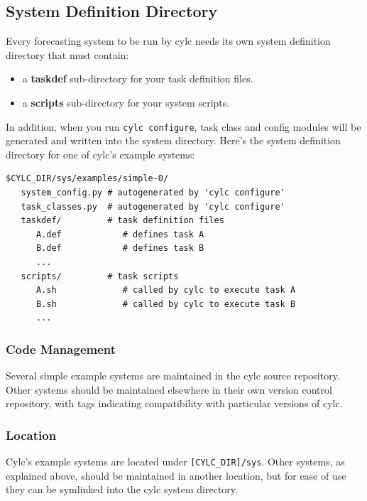 \documentclass[11pt,a4paper]{article}
\begin{document}
\label{sec:systemdefdir}
\subsection{System Definition Directory}

Every forecasting system to be run by cylc needs its own system
definition directory that must contain: 

\begin{itemize} 
    \item a {\bf taskdef} sub-directory for your task definition files.
    \item a {\bf scripts} sub-directory for your system scripts.
\end{itemize} 

In addition, when you run \lstinline{cylc configure}, task class and
config modules will be generated and written into the system directory.
Here's the system definition directory for one of cylc's example
systems: 

\lstset{language=bash}
\begin{lstlisting}
$CYLC_DIR/sys/examples/simple-0/
   system_config.py # autogenerated by 'cylc configure' 
   task_classes.py  # autogenerated by 'cylc configure' 
   taskdef/         # task definition files
      A.def            # defines task A
      B.def            # defines task B
      ...
   scripts/         # task scripts
      A.sh             # called by cylc to execute task A
      B.sh             # called by cylc to execute task B
      ...
\end{lstlisting}

\subsubsection{Code Management}

Several simple example systems are maintained in the cylc source
repository.  Other systems should be maintained elsewhere in their
own version control repository, with tags indicating compatibility with
particular versions of cylc.

\subsubsection{Location}

Cylc's example systems are located under \lstinline=[CYLC_DIR]/sys=.
Other systems, as explained above, should be maintained in another
location, but for ease of use they can be symlinked into the cylc system
directory.
\end{document}
